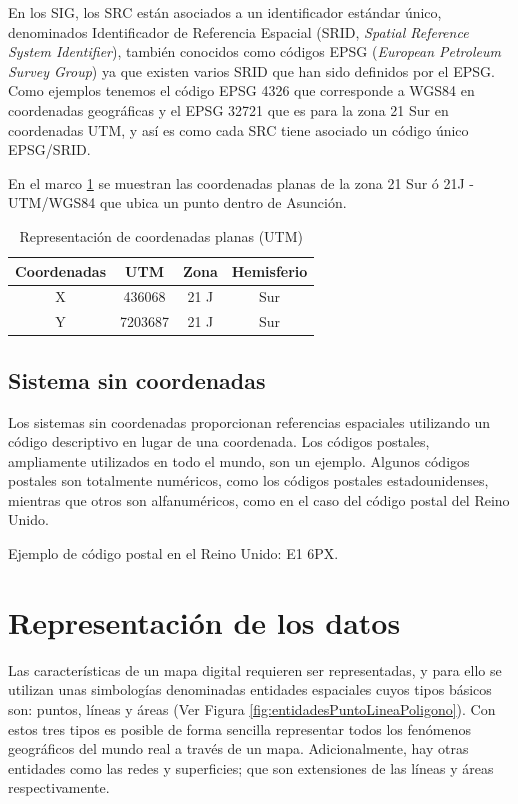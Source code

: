En los SIG, los SRC están asociados a un identificador estándar único, denominados Identificador de Referencia Espacial (SRID, \textit{Spatial Reference System Identifier}), también conocidos como códigos EPSG (\textit{European Petroleum Survey Group}) ya que existen varios SRID que han sido definidos por el EPSG. Como ejemplos tenemos el código EPSG 4326 que corresponde a WGS84 en coordenadas geográficas y el EPSG 32721 que es para la zona 21 Sur en coordenadas UTM, y así es como cada SRC tiene asociado un código único EPSG/SRID.

En el marco \ref{table:coordenadasPlanas} se muestran las coordenadas planas de la zona 21 Sur ó 21J - UTM/WGS84 que ubica un punto dentro de Asunción.

\begin{table}[H]
\caption{Representación de coordenadas planas (UTM)}
\centering
\begin{tabular}{cccc}
\hline
Coordenadas & UTM     & Zona & Hemisferio \\ \hline
X           & 436068  & 21 J & Sur        \\
Y           & 7203687 & 21 J & Sur        \\ \hline
\end{tabular}
\label{table:coordenadasPlanas}
\end{table}

\subsection{Sistema sin coordenadas}
Los sistemas sin coordenadas proporcionan referencias espaciales utilizando un código descriptivo en lugar de una coordenada. Los códigos postales, ampliamente utilizados en todo el mundo, son un ejemplo. Algunos códigos postales son totalmente numéricos, como los códigos postales estadounidenses, mientras que otros son alfanuméricos, como en el caso del código postal del Reino Unido.

Ejemplo de código postal en el Reino Unido: E1 6PX.

\section{Representación de los datos}

Las características de un mapa digital requieren ser representadas, y para ello se utilizan unas simbologías denominadas entidades espaciales cuyos tipos básicos son: puntos, líneas y áreas (Ver Figura \ref{fig:entidadesPuntoLineaPoligono}). Con estos tres tipos es posible de forma sencilla representar todos los fenómenos geográficos del mundo real a través de un mapa. Adicionalmente, hay otras entidades como las redes y superficies; que son extensiones de las líneas y áreas respectivamente.

